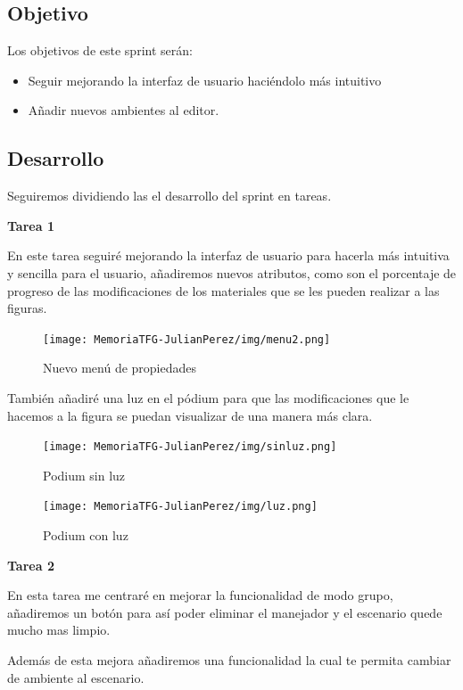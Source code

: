 \documentclass[a4paper, 12pt]{book}
\begin{document}
\subsection{Objetivo}
Los objetivos de este sprint serán:
\begin{itemize}
    \item Seguir mejorando la interfaz de usuario haciéndolo más intuitivo
    \item Añadir nuevos ambientes al editor.
\end{itemize}

\subsection{Desarrollo}
Seguiremos dividiendo las el desarrollo del sprint en tareas.

\textbf{Tarea 1}

En este tarea seguiré mejorando la interfaz de usuario para hacerla más intuitiva y sencilla para el usuario, añadiremos nuevos atributos, como son el porcentaje de progreso de las modificaciones de los materiales que se les pueden realizar a las figuras.

\begin{figure}[H]
  \centering
  \texttt{[image: MemoriaTFG-JulianPerez/img/menu2.png]}
  \caption{Nuevo menú de propiedades}\label{menu2}
\end{figure}

También añadiré una luz en el pódium para que las modificaciones que le hacemos a la figura se puedan visualizar de una manera más clara.

\begin{figure}[H]
  \centering
  \begin{minipage}[b]{0.4\textwidth}
 \texttt{[image: MemoriaTFG-JulianPerez/img/sinluz.png]}
  \caption{Podium sin luz}\label{single}
  \end{minipage}
  \hfill
  \begin{minipage}[b]{0.4\textwidth}
  \texttt{[image: MemoriaTFG-JulianPerez/img/luz.png]}
  \caption{Podium con luz}\label{scrum}
  \end{minipage}
\end{figure}

\textbf{Tarea 2}

En esta tarea me centraré en mejorar la funcionalidad de modo grupo, añadiremos un botón para así poder eliminar el manejador y el escenario quede mucho mas limpio.

Además de esta mejora añadiremos una funcionalidad la cual te permita cambiar de ambiente al escenario.
\end{document}
